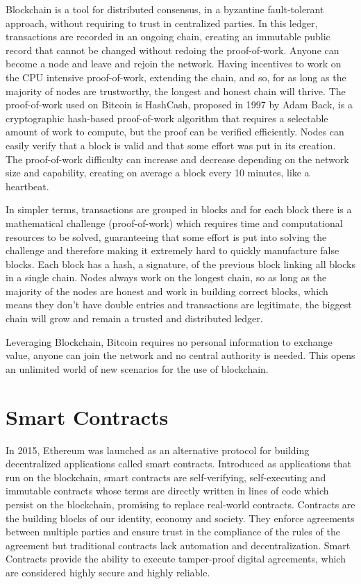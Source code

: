 Blockchain is a tool for distributed consensus, in a byzantine fault-tolerant approach, without requiring to trust in centralized parties. In this ledger, transactions are recorded in an ongoing chain, creating an immutable public record that cannot be changed without redoing the proof-of-work. Anyone can become a node and leave and rejoin the network. Having incentives to work on the CPU intensive proof-of-work, extending the chain, and so, for as long as the majority of nodes are trustworthy, the longest and honest chain will thrive. The proof-of-work used on Bitcoin is HashCash, proposed in 1997 by Adam Back, is a cryptographic hash-based proof-of-work algorithm that requires a selectable amount of work to compute, but the proof can be verified efficiently. Nodes can easily verify that a block is valid and that some effort was put in its creation. The proof-of-work difficulty can increase and decrease depending on the network size and capability, creating on average a block every 10 minutes, like a heartbeat.

In simpler terms, transactions are grouped in blocks and for each block there is a mathematical challenge (proof-of-work) which requires time and computational resources to be solved, guaranteeing that some effort is put into solving the challenge and therefore making it extremely hard to quickly manufacture false blocks. Each block has a hash, a signature, of the previous block linking all blocks in a single chain. Nodes always work on the longest chain, so as long as the majority of the nodes are honest and work in building correct blocks, which means they don't have double entries and transactions are legitimate, the biggest chain will grow and remain a trusted and distributed ledger.

Leveraging Blockchain, Bitcoin requires no personal information to exchange value, anyone can join the network and no central authority is needed. This opens an unlimited world of new scenarios for the use of blockchain.



\section{Smart Contracts}

In 2015, Ethereum was launched as an alternative protocol for building decentralized applications called smart contracts. Introduced as applications that run on the blockchain, smart contracts are self-verifying, self-executing and immutable contracts whose terms are directly written in lines of code which persist on the blockchain, promising to replace real-world contracts. Contracts are the building blocks of our identity, economy and society. They enforce agreements between multiple parties and ensure trust in the compliance of the rules of the agreement but traditional contracts lack automation and decentralization. Smart Contracts provide the ability to execute tamper-proof digital agreements, which are considered highly secure and highly reliable. 

